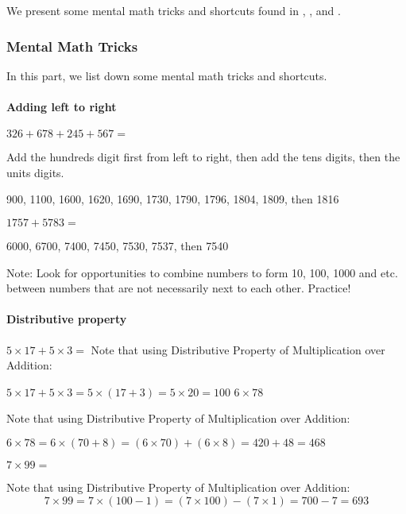 We present some mental math tricks and shortcuts found in \textcite{benjamin}, \textcite{short}, and \textcite{stephens}.

\subsubsection*{Mental Math Tricks}
In this part, we list down some mental math tricks and shortcuts.

\paragraph*{Adding left to right}
\begin{example}
\Item $326 + 678 + 245 + 567 =$

Add the hundreds digit first from left to right, then add the tens digits, then the units digits.

900, 1100, 1600, 1620, 1690, 1730, 1790, 1796, 1804, 1809, then 1816

\Item $1757 + 5783 =$

6000, 6700, 7400, 7450, 7530, 7537, then 7540

Note: Look for opportunities to combine numbers to form 10, 100, 1000 and etc. between
numbers that are not necessarily next to each other. Practice!
\end{example}
\paragraph*{Distributive property}
\begin{example}
\Item $5 \times 17 + 5 \times 3 =$
Note that using Distributive Property of Multiplication over Addition:

$5 \times 17 + 5 \times 3 = 5 \times (17 + 3) = 5 \times 20 = 100$
\Item $6\times 78$

Note that using Distributive Property of Multiplication over Addition:

$6 \times 78 = 6 \times (70 + 8) = (6 \times 70) + (6 \times 8) = 420 + 48 = 468$

\Item $7\times 99=$

Note that using Distributive Property of Multiplication over Addition:
\begin{equation*}
7 \times 99 = 7 \times (100 - 1) = (7 \times 100) - (7 \times 1) = 700 - 7 = 693
\end{equation*}
\end{example}

